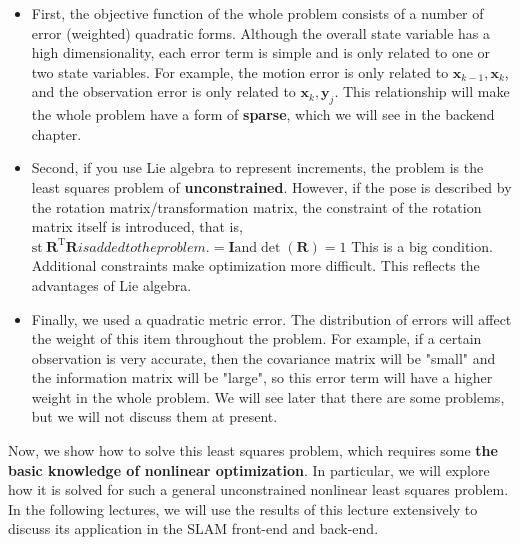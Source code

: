 \begin{itemize}
\item First, the objective function of the whole problem consists of a number of error (weighted) quadratic forms. Although the overall state variable has a high dimensionality, each error term is simple and is only related to one or two state variables. For example, the motion error is only related to $\bm{x}_{k-1}, \bm{x}_k$, and the observation error is only related to $\bm{x}_k, \bm{y}_j$. This relationship will make the whole problem have a form of \textbf{sparse}, which we will see in the backend chapter.

\item Second, if you use Lie algebra to represent increments, the problem is the least squares problem of \textbf{unconstrained}. However, if the pose is described by the rotation matrix/transformation matrix, the constraint of the rotation matrix itself is introduced, that is, $\mathrm{st}\ \bm{R}^\mathrm{T} \bm{R} is added to the problem. =\bm{I} \text{and} \det (\bm{R})=1$ This is a big condition. Additional constraints make optimization more difficult. This reflects the advantages of Lie algebra.

\item Finally, we used a quadratic metric error. The distribution of errors will affect the weight of this item throughout the problem. For example, if a certain observation is very accurate, then the covariance matrix will be "small" and the information matrix will be "large", so this error term will have a higher weight in the whole problem. We will see later that there are some problems, but we will not discuss them at present.
\end{itemize}

Now, we show how to solve this least squares problem, which requires some \textbf{the basic knowledge of nonlinear optimization}. In particular, we will explore how it is solved for such a general unconstrained nonlinear least squares problem. In the following lectures, we will use the results of this lecture extensively to discuss its application in the SLAM front-end and back-end.


